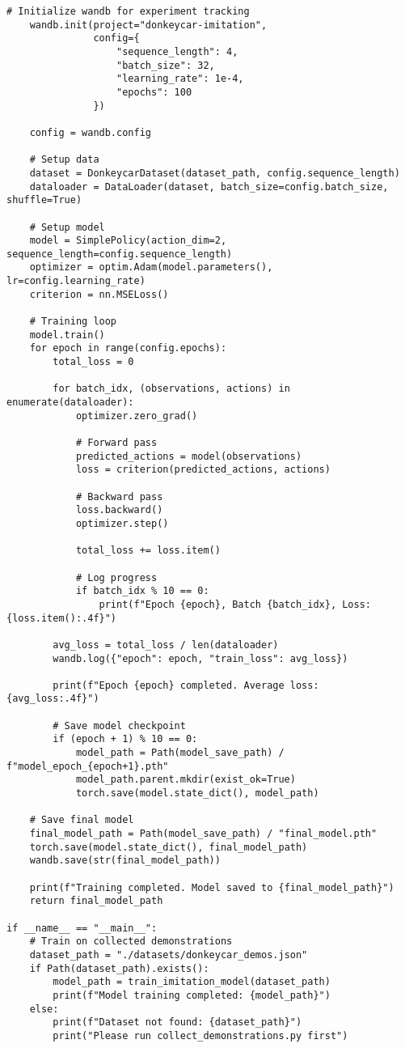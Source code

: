 \documentclass[11pt,a4paper]{article}
\begin{document}
\begin{lstlisting}[style=pythonstyle, caption={Imitation learning with LeRobot (train\_imitation.py)}]
    # Initialize wandb for experiment tracking
    wandb.init(project="donkeycar-imitation", 
               config={
                   "sequence_length": 4,
                   "batch_size": 32,
                   "learning_rate": 1e-4,
                   "epochs": 100
               })
    
    config = wandb.config
    
    # Setup data
    dataset = DonkeycarDataset(dataset_path, config.sequence_length)
    dataloader = DataLoader(dataset, batch_size=config.batch_size, shuffle=True)
    
    # Setup model
    model = SimplePolicy(action_dim=2, sequence_length=config.sequence_length)
    optimizer = optim.Adam(model.parameters(), lr=config.learning_rate)
    criterion = nn.MSELoss()
    
    # Training loop
    model.train()
    for epoch in range(config.epochs):
        total_loss = 0
        
        for batch_idx, (observations, actions) in enumerate(dataloader):
            optimizer.zero_grad()
            
            # Forward pass
            predicted_actions = model(observations)
            loss = criterion(predicted_actions, actions)
            
            # Backward pass
            loss.backward()
            optimizer.step()
            
            total_loss += loss.item()
            
            # Log progress
            if batch_idx % 10 == 0:
                print(f"Epoch {epoch}, Batch {batch_idx}, Loss: {loss.item():.4f}")
        
        avg_loss = total_loss / len(dataloader)
        wandb.log({"epoch": epoch, "train_loss": avg_loss})
        
        print(f"Epoch {epoch} completed. Average loss: {avg_loss:.4f}")
        
        # Save model checkpoint
        if (epoch + 1) % 10 == 0:
            model_path = Path(model_save_path) / f"model_epoch_{epoch+1}.pth"
            model_path.parent.mkdir(exist_ok=True)
            torch.save(model.state_dict(), model_path)
    
    # Save final model
    final_model_path = Path(model_save_path) / "final_model.pth"
    torch.save(model.state_dict(), final_model_path)
    wandb.save(str(final_model_path))
    
    print(f"Training completed. Model saved to {final_model_path}")
    return final_model_path

if __name__ == "__main__":
    # Train on collected demonstrations
    dataset_path = "./datasets/donkeycar_demos.json"
    if Path(dataset_path).exists():
        model_path = train_imitation_model(dataset_path)
        print(f"Model training completed: {model_path}")
    else:
        print(f"Dataset not found: {dataset_path}")
        print("Please run collect_demonstrations.py first")
\end{lstlisting}
\end{document}
